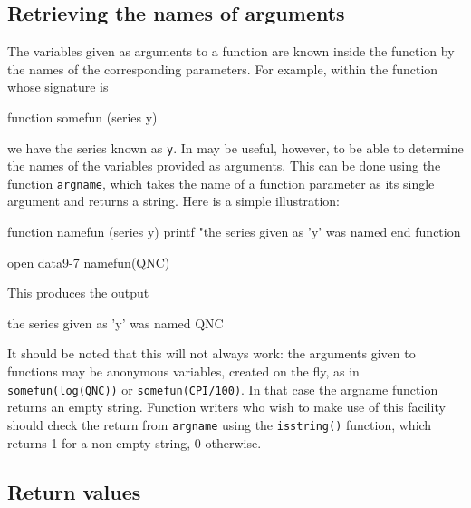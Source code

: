 \subsection{Retrieving the names of arguments}

The variables given as arguments to a function are known inside the
function by the names of the corresponding parameters.  For example,
within the function whose signature is
%
\begin{code}
function somefun (series y)
\end{code}
%
we have the series known as \texttt{y}.  In may be useful, however, to
be able to determine the names of the variables provided as arguments.
This can be done using the function \texttt{argname}, which takes the
name of a function parameter as its single argument and returns a
string.  Here is a simple illustration:
%
\begin{code}
function namefun (series y)
  printf "the series given as 'y' was named %
end function

open data9-7
namefun(QNC)
\end{code}
%
This produces the output
%
\begin{code}
the series given as 'y' was named QNC
\end{code}

It should be noted that this will not always work: the arguments given
to functions may be anonymous variables, created on the fly, as in
\texttt{somefun(log(QNC))} or \texttt{somefun(CPI/100)}.  In that case
the \textsf{argname} function returns an empty string.  Function
writers who wish to make use of this facility should check the return
from \texttt{argname} using the \texttt{isstring()} function, which
returns 1 for a non-empty string, 0 otherwise.


\subsection{Return values}

